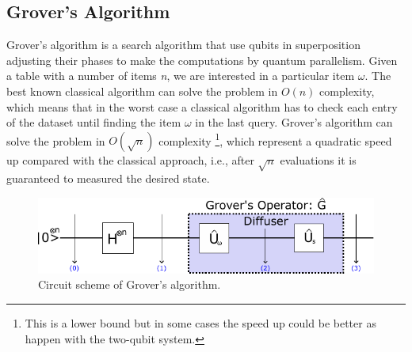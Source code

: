 \subsection{Grover's Algorithm}
Grover's algorithm is a search algorithm that use qubits in superposition adjusting their phases to make the computations by quantum parallelism. Given a table with a number of items \textit{n}, we are interested in a particular item $\omega$. The best known classical algorithm can solve the problem in $O(n)$ complexity, which means that in the worst case a classical algorithm has to check each entry of the dataset until finding the item $\omega$ in the last query. Grover's algorithm can solve the problem in $O(\sqrt{n})$ complexity \footnote{This is a lower bound but in some cases the speed up could be better as happen with the two-qubit system.}, which represent a quadratic speed up compared with the classical approach, i.e., after $\sqrt{n}$ evaluations it is guaranteed to measured the desired state.
\begin{figure}[h]
    \centering
    \includegraphics[scale=0.8]{Figures/Grover_Circuit.pdf}
    \caption{Circuit scheme of Grover's algorithm.}
    \label{fig:Grover_circuit}
\end{figure}
